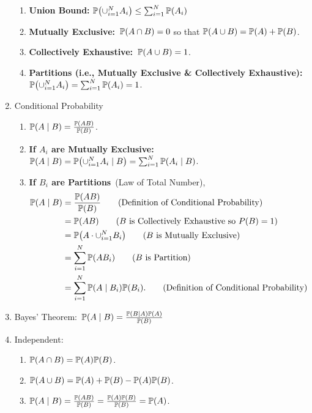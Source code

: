 \begin{enumerate}
\begin{enumerate}
        \item \textbf{Union Bound:} $\P{\cup_{i=1}^N A_i}\leq \sum_{i=1}^{N}\P{A_i}$
        \item \textbf{Mutually Exclusive:}~$\P{A \cap B}=0$ so that $\P{A \cup B} = \P{A}+\P{B}$.
        \item \textbf{Collectively Exhaustive:}~$\P{A\cup B}=1$.
        \item \textbf{Partitions (i.e., Mutually Exclusive \& Collectively Exhaustive):}~$\P{\cup_{i=1}^N A_i}=\sum_{i=1}^{N}\P{A_i}=1$.
    \end{enumerate}
    \item Conditional Probability
    \begin{enumerate}
        \item $\condP{A}{B} = \frac{\P{AB}}{\P{B}}$.
        \item \textbf{If $A_i$ are Mutually Exclusive:}~$\condP{A}{B} = \condP{\cup_{i=1}^{N}A_i}{B} = \sum_{i=1}^{N}\condP{A_i}{B}$.
        \item \textbf{If $B_i$ are Partitions}~(Law of Total Number),
        \begin{align}
             \condP{A}{B} 
             &= \frac{\P{AB}}{\P{B}}  \tag{Definition of Conditional Probability}\\
             &= \P{AB}  \tag{$B$ is Collectively Exhaustive so $P(B)=1$} \\
             &= \P{A\cdot\cup_{i=1}^{N}B_i}  \tag{$B$ is Mutually Exclusive} \\
             &= \sum_{i=1}^{N}\P{AB_i}  \tag{$B$ is Partition} \\
             &= \sum_{i=1}^{N}\condP{A}{B_i}\P{B_i}. \tag{Definition of Conditional Probability}
        \end{align}
    \end{enumerate}
    \item Bayes' Theorem:~$\condP{A}{B} = \frac{\condP{B}{A}\P{A}}{\P{B}}$
    \item Independent:{
        \begin{enumerate}
            \item $\P{A\cap B}=\P{A}\P{B}$.
            \item $\P{A \cup B} = \P{A}+\P{B}-\P{A}\P{B}$.
            \item $\condP{A}{B} = \frac{\P{AB}}{\P{B}}=\frac{\P{A}\P{B}}{\P{B}}=\P{A}$.
        \end{enumerate}
    } 
\end{enumerate}